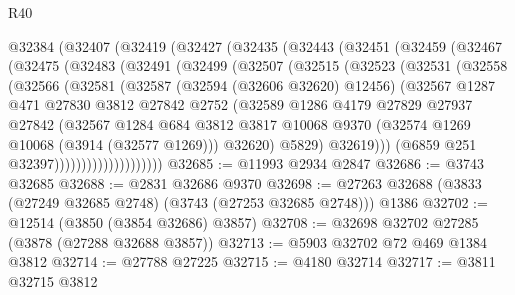 \begin{lexlean}{R40}
\begin{coremodule}
    @32384
      (@32407
        (@32419
          (@32427
            (@32435
              (@32443
                (@32451
                  (@32459
                    (@32467
                      (@32475
                        (@32483
                          (@32491
                            (@32499
                              (@32507
                                (@32515
                                  (@32523
                                    (@32531
                                      (@32558
                                        (@32566
                                          (@32581
                                            (@32587
                                              (@32594 (@32606 @32620) @12456)
                                              (@32567
                                                @1287
                                                @471
                                                @27830
                                                @3812
                                                @27842
                                                @2752
                                                (@32589
                                                  @1286
                                                  @4179
                                                  @27829
                                                  @27937
                                                  @27842
                                                  (@32567
                                                    @1284
                                                    @684
                                                    @3812
                                                    @3817
                                                    @10068
                                                    @9370
                                                    (@32574 @1269 @10068 (@3914 (@32577 @1269)))
                                                    @32620)
                                                  @5829)
                                                @32619)))
                                          (@6859 @251 @32397))))))))))))))))))))
@32685 := @11993 @2934 @2847
@32686 := @3743 @32685
@32688 := @2831 @32686 @9370
@32698 := @27263 @32688 (@3833 (@27249 @32685 @2748) (@3743 (@27253 @32685 @2748))) @1386
@32702 := @12514 (@3850 (@3854 @32686) @3857)
@32708 := @32698 @32702 @27285 (@3878 (@27288 @32688 @3857))
@32713 := @5903 @32702 @72 @469 @1384 @3812
@32714 := @27788 @27225
@32715 := @4180 @32714
@32717 := @3811 @32715 @3812

\end{coremodule}
\end{lexlean}
